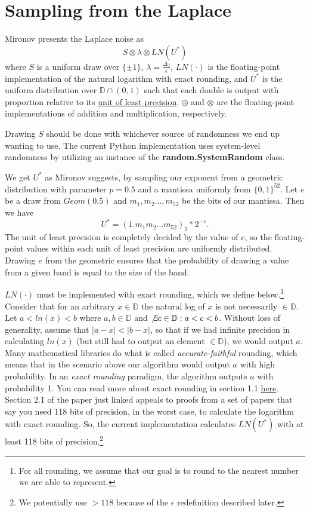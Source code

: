 \documentclass[11pt]{scrartcl} %
\begin{document}
\section{Sampling from the Laplace}
Mironov presents the Laplace noise as
\[ S \otimes \lambda \otimes LN(U^*) \]
where $S$ is a uniform draw over $\{\pm 1\}$, $\lambda = \frac{\Delta_f}{\epsilon}$, $LN(\cdot)$ is the floating-point implementation of the natural logarithm with exact rounding, and $U^*$ is the uniform distribution over $\mathbb{D} \cap (0,1)$ such that each double is output with proportion relative to its \href{https://en.wikipedia.org/wiki/Unit_in_the_last_place}{unit of least precision}. $\oplus$ and $\otimes$ are the floating-point implementations of addition and multiplication, respectively. \newline

Drawing $S$ should be done with whichever source of randomness we end up wanting to use. The current Python implementation uses system-level randomness by utilizing an instance of the \textbf{random.SystemRandom} class. \newline

We get $U^*$ as Mironov suggests, by sampling our exponent from a geometric distribution with parameter $p = 0.5$ and a mantissa uniformly from $\{0,1\}^{52}$. Let $e$ be a draw from $Geom(0.5)$ and $m_1, m_2 \hdots, m_{52}$ be the bits of our mantissa. Then we have
\[ U^{*} = (1.m_1m_2 \hdots m_{52})_2 * 2^{- e}. \]
The unit of least precision is completely decided by the value of $e$, so the floating-point values within each unit of least precision are uniformly distributed. Drawing $e$ from the geometric ensures that the probability of drawing a value from a given band is equal to the size of the band. \newline

$LN(\cdot)$ must be implemented with exact rounding, which we define below.\footnote{For all rounding, we assume that our goal is to round to the nearest number we are able to represent.} Consider that for an arbitrary $x \in \mathbb{D}$ the natural log of $x$ is not necessarily $\in \mathbb{D}$. Let $a < ln(x) < b$ where $a,b \in \mathbb{D}$ and $\not\exists c \in \mathbb{D}: a < c < b$. Without loss of generality, assume that $\vert a-x \vert < \vert b - x \vert$, so that if we had infinite precision in calculating $ln(x)$ (but still had to output an element $\in \mathbb{D}$), we would output $a$.
Many mathematical libraries do what is called \textit{accurate-faithful} rounding, which means that in the scenario above our algorithm would output $a$ with high probability. In an \textit{exact rounding} paradigm, the algorithm outputs $a$ with probability 1. You can read more about exact rounding in section 1.1 \href{http://www.ens-lyon.fr/LIP/Pub/Rapports/RR/RR2005/RR2005-37.pdf}{here}. Section 2.1 of the paper just linked appeals to proofs from a set of papers that say you need 118 bits of precision, in the worst case, to calculate the logarithm with exact rounding. So, the current implementation calculates $LN(U^*)$ with at least 118 bits of precision.\footnote{We potentially use $> 118$ because of the $\epsilon$ redefinition described later.} \newline
\end{document}
